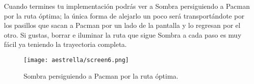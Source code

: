 Cuando termines tu implementación podrás ver a Sombra persiguiendo a Pacman por la ruta óptima; la única forma de alejarlo un poco será transportándote por los pasillos que sacan a Pacman por un lado de la pantalla y lo regresan por el otro.  Si gustas, borrar e iluminar la ruta que sigue Sombra a cada paso es muy fácil ya teniendo la trayectoria completa.

\begin{figure}
  \centering
  \texttt{[image: aestrella/screen6.png]}
  \caption{Sombra persiguiendo a Pacman por la ruta óptima.}
  \label{fig:fig1P4}
\end{figure}
